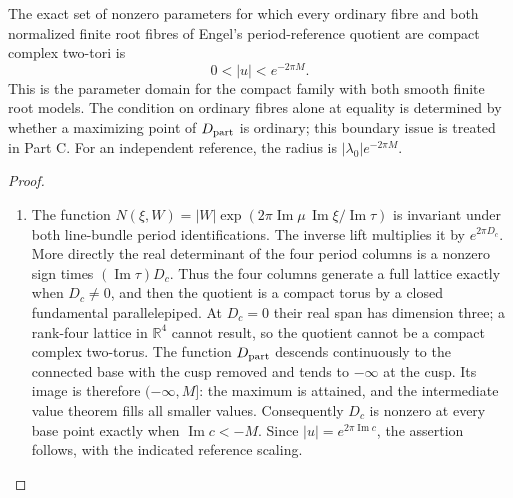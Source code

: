 \begin{proposition}\hypertarget{tag-01Q8}{}\label{fam:src:B.1.2}\label{fam:st:B.1.2}

The exact set of nonzero parameters for which every ordinary fibre and both normalized finite root fibres of Engel's period-reference quotient are compact complex two-tori is
\[
 0<|u|<e^{-2\pi M}.
\]
This is the parameter domain for the compact family with both smooth finite root models. The condition on ordinary fibres alone at equality is determined by whether a maximizing point of $D_{\rm part}$ is ordinary; this boundary issue is treated in Part C. For an independent reference, the radius is $|\lambda_0|e^{-2\pi M}$.
\end{proposition}


\begin{proof}
\begin{enumerate}[label=\arabic*.,leftmargin=*]
\item The function $N(\xi,W)=|W|\exp(2\pi\operatorname{Im}\mu\,\operatorname{Im}\xi/\operatorname{Im}\tau)$ is invariant under both line-bundle period identifications. The inverse lift multiplies it by $e^{2\pi D_c}$. More directly the real determinant of the four period columns is a nonzero sign times $(\operatorname{Im}\tau)D_c$. Thus the four columns generate a full lattice exactly when $D_c\ne0$, and then the quotient is a compact torus by a closed fundamental parallelepiped. At $D_c=0$ their real span has dimension three; a rank-four lattice in $\mathbb R^4$ cannot result, so the quotient cannot be a compact complex two-torus. The function $D_{\rm part}$ descends continuously to the connected base with the cusp removed and tends to $-\infty$ at the cusp. Its image is therefore $(-\infty,M]$: the maximum is attained, and the intermediate value theorem fills all smaller values. Consequently $D_c$ is nonzero at every base point exactly when $\operatorname{Im}c<-M$. Since $|u|=e^{2\pi\operatorname{Im}c}$, the assertion follows, with the indicated reference scaling.
\end{enumerate}
\end{proof}
